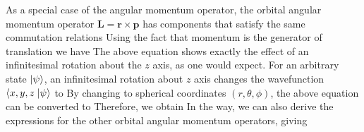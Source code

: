 As a special case of the angular momentum operator, the orbital angular momentum operator 
$\mathbf{L} = \mathbf{r} \times \mathbf{p}$ has components that satisfy the same commutation relations
Using the fact that momentum is the generator of translation
 we have
The above equation shows exactly the effect of an infinitesimal rotation about the $z$ axis, as one would expect. For an 
arbitrary state $| \psi \rangle$, an infinitesimal rotation about $z$ axis changes the wavefunction $\left\langle x, y, z \right.| \psi \rangle$ to 
By changing to spherical coordinates $(r, \theta, \phi)$, the above equation can be converted to
Therefore, we obtain
In the way, we can also derive the expressions for the other orbital angular momentum operators, giving


